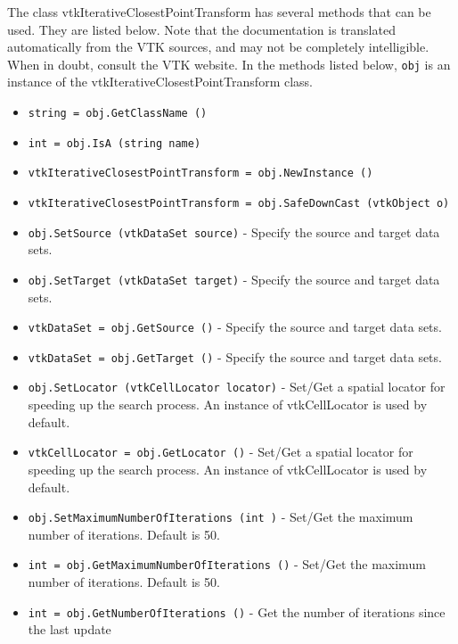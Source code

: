 The class vtkIterativeClosestPointTransform has several methods that can be used.
  They are listed below.
Note that the documentation is translated automatically from the VTK sources,
and may not be completely intelligible.  When in doubt, consult the VTK website.
In the methods listed below, \verb|obj| is an instance of the vtkIterativeClosestPointTransform class.
\begin{itemize}
\item  \verb|string = obj.GetClassName ()|

\item  \verb|int = obj.IsA (string name)|

\item  \verb|vtkIterativeClosestPointTransform = obj.NewInstance ()|

\item  \verb|vtkIterativeClosestPointTransform = obj.SafeDownCast (vtkObject o)|

\item  \verb|obj.SetSource (vtkDataSet source)| -  Specify the source and target data sets.

\item  \verb|obj.SetTarget (vtkDataSet target)| -  Specify the source and target data sets.

\item  \verb|vtkDataSet = obj.GetSource ()| -  Specify the source and target data sets.

\item  \verb|vtkDataSet = obj.GetTarget ()| -  Specify the source and target data sets.

\item  \verb|obj.SetLocator (vtkCellLocator locator)| -  Set/Get a spatial locator for speeding up the search process. 
 An instance of vtkCellLocator is used by default.

\item  \verb|vtkCellLocator = obj.GetLocator ()| -  Set/Get a spatial locator for speeding up the search process. 
 An instance of vtkCellLocator is used by default.

\item  \verb|obj.SetMaximumNumberOfIterations (int )| -  Set/Get the  maximum number of iterations. Default is 50.

\item  \verb|int = obj.GetMaximumNumberOfIterations ()| -  Set/Get the  maximum number of iterations. Default is 50.

\item  \verb|int = obj.GetNumberOfIterations ()| -  Get the number of iterations since the last update


\end{itemize}
